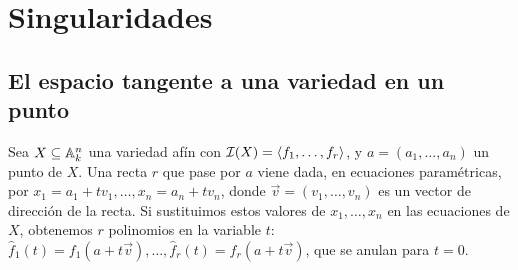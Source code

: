 \documentclass[ACGA.tex]{subfiles}
\begin{document}
%
%
%
%
%
%
%
%
%
%
%
%
%

\chapter{Singularidades}

\section{El espacio tangente a una variedad en un punto}

Sea $X\subseteq\mathbb{A}^n_k$ una variedad afín con $\mathcal{I}(X)=\langle f_1,\ldots,f_r\rangle$, y $a=(a_1,\ldots,a_n)$ un punto de $X$. Una recta $r$ que pase por $a$ viene dada, en ecuaciones paramétricas, por $x_1=a_1+tv_1,\ldots,x_n=a_n+tv_n$, donde $\overrightarrow v=(v_1,\ldots,v_n)$ es un vector de dirección de la recta. Si sustituimos estos valores de $x_1,\ldots,x_n$ en las ecuaciones de $X$, obtenemos $r$ polinomios en la variable $t$: $\hat f_1(t)=f_1(a+t\overrightarrow v),\ldots,\hat f_r(t)=f_r(a+t\overrightarrow v)$, que se anulan para $t=0$. 
\end{document}
